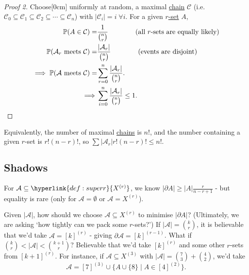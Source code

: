 \documentclass{article}
\let\subset\subseteq
\begin{document}
\begin{proof}[Proof 2]
  Choose[0cm] uniformly at random, a maximal \hyperlink{def:chain}{chain} $\mathcal{C}$ (i.e.\ $\mathcal{C}_0 \subset \mathcal{C}_1 \subset \mathcal{C}_2 \subset \dotsb \subset \mathcal{C}_n$) with $|\mathcal{C}_i| = i \; \forall i$.
  For a given \hyperlink{def:superr}{$r$-set} $A$,
 \begin{align*}\mathbb{P}(A \in \mathcal{C}) = &\frac{1}{\binom{n}{r}} \qquad \qquad \text{(all $r$-sets are equally likely)} \\
    \mathbb{P}(\mathcal{A}_r \text{ meets } \mathcal{C}) = &\frac{|\mathcal{A}_r|}{\binom{n}{r}} \qquad \qquad \text{(events are disjoint)} \\
    \implies \mathbb{P}(\mathcal{A} \text{ meets }\mathcal{C}) = &\sum_{r=0}^n \frac{|\mathcal{A}_r|}{\binom{n}{r}}. \\
    \implies &\sum_{i=0}^n \frac{|\mathcal{A}_r|}{\binom{n}{r}} \leq 1. \qedhere
  \end{align*}
\end{proof}
\begin{remark}
  Equivalently, the number of maximal \hyperlink{def:chain}{chains} is $n!$, and the number containing a given $r$-set is $r! (n-r)!$, so $\sum |\mathcal{A}_r| r! (n-r)! \leq n!$.
\end{remark}
\subsection{Shadows}
For $\mathcal{A} \subset \hyperlink{def:superr}{X^{(r)}}$, we know $|\partial A| \geq |A| \frac{r}{n-r+1}$ - but equality is rare (only for $\mathcal{A} = \emptyset$ or $\mathcal{A} = X^{(r)}$).

Given $|\mathcal{A}|$, how should we choose $\mathcal{A} \subset X^{(r)}$ to minimise $|\partial A|$?
(Ultimately, we are asking `how tightly can we pack some $r$-sets?')
If $|\mathcal{A}| = \binom{k}{r}$, it is believable that we'd take $\mathcal{A} = [k]^{(r)}$ - giving $\partial \mathcal{A} = [k]^{(r-1)}$.
What if $\binom{k}{r} < |\mathcal{A}| < \binom{k+1}{r}$? Believable that we'd take $[k]^{(r)}$ and some other $r$-sets from $[k+1]^{(r)}$.
For instance, if $\mathcal{A} \subset X^{(3)}$ with $|\mathcal{A}| = \binom{7}{3} + \binom{4}{2}$, we'd take
\begin{equation*}\mathcal{A} = [7]^{(3)} \cup \{A \cup \{8\} \mid A\in [4]^{(2)}\}.\end{equation*}
\end{document}
